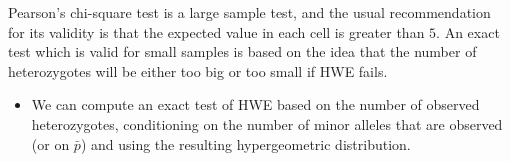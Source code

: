 \documentclass[a4paper,twoside,11pt]{article}
\begin{document}
\newline
\newline
Pearson’s chi-square test is a \textcolor{NavyBlue}{large sample test}, and the usual recommendation for its validity is that the expected value in each cell is greater than $5$.
\newline
\newline
An exact test which is valid for \textcolor{NavyBlue}{small samples} is based on the idea that the number of heterozygotes will be either too big or too small if HWE fails.
\begin{itemize}
    \item We can compute an exact test of HWE based on the number of observed heterozygotes, conditioning on the number of minor alleles that are observed (or on $\bar{p}$) and using the resulting hypergeometric distribution.
\end{itemize}
\end{document}
